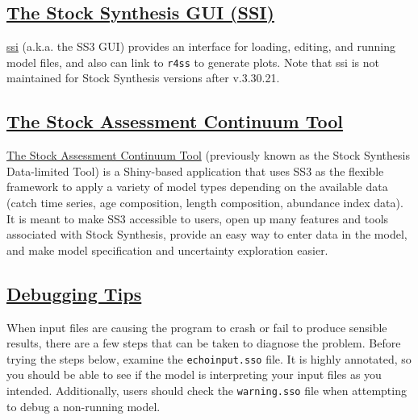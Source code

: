 \hypertarget{SSI}{}
\subsection[The Stock Synthesis GUI (SSI)]{\protect\hyperlink{SSI}{The Stock Synthesis GUI (SSI)}}
\href{https://vlab.noaa.gov/web/stock-synthesis/document-library/-/document_library/0LmuycloZeIt/view/5042951}{\gls{ssi}} (a.k.a. the SS3 GUI) provides an interface for loading, editing, and running model files, and also can link to \texttt{r4ss} to generate plots. Note that \gls{ssi} is not maintained for Stock Synthesis versions after v.3.30.21.

\hypertarget{SAC}{}
\subsection[The Stock Assessment Continuum Tool]{\protect\hyperlink{SAC}{The Stock Assessment Continuum Tool}}
\href{https://github.com/shcaba/SS-DL-tool}{The Stock Assessment Continuum Tool} (previously known as the Stock Synthesis Data-limited Tool) is a Shiny-based application that uses SS3 as the flexible framework to apply a variety of model types depending on the available data (catch time series, age composition, length composition, abundance index data). It is meant to make SS3 accessible to users, open up many features and tools associated with Stock Synthesis, provide an easy way to enter data in the model, and make model specification and uncertainty exploration easier.

\hypertarget{Debugging}{}
\subsection[Debugging Tips]{\protect\hyperlink{Debugging}{Debugging Tips}}
When input files are causing the program to crash or fail to produce sensible results, there are a few steps that can be taken to diagnose the problem. Before trying the steps below, examine the \texttt{echoinput.sso} file. It is highly annotated, so you should be able to see if the model is interpreting your input files as you intended.  Additionally, users should check the \texttt{warning.sso} file when attempting to debug a non-running model.

